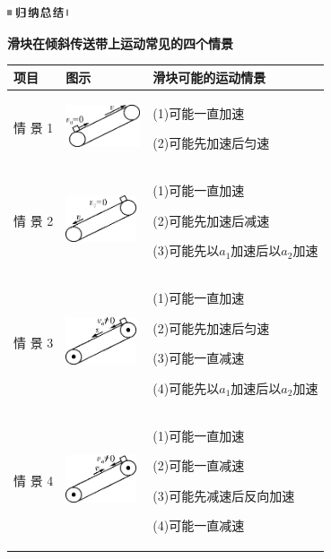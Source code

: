 \begin{center}\includegraphics[width=0.70833in,height=0.125in]{media/image13.png}

\textbf{滑块在倾斜传送带上运动常见的四个情景}
\end{center}


\begin{longtable}[]{@{}m{1cm}m{2.5cm}m{5cm}@{}}
\toprule
项目 & 图示 & 滑块可能的运动情景\tabularnewline
\midrule
\endhead

情
景
1
&
\includegraphics[width=0.86458in,height=0.48958in]{media/image127.png}
&
(1)可能一直加速

(2)可能先加速后匀速
\tabularnewline

情
景
2
&
\includegraphics[width=0.82292in,height=0.54167in]{media/image128.png}
&
(1)可能一直加速

(2)可能先加速后减速

(3)可能先以$a_1$加速后以$a_2$加速
\tabularnewline

情
景
3
&
\includegraphics[width=0.82292in,height=0.55208in]{media/image129.png}
&
(1)可能一直加速

(2)可能先加速后匀速

(3)可能一直减速

(4)可能先以$a_1$加速后以$a_2$加速
\tabularnewline

情
景
4
&
\includegraphics[width=0.82292in,height=0.55208in]{media/image130.png}
&
(1)可能一直加速

(2)可能一直减速

(3)可能先减速后反向加速

(4)可能一直减速
\tabularnewline
\bottomrule
\end{longtable}
\newpage
